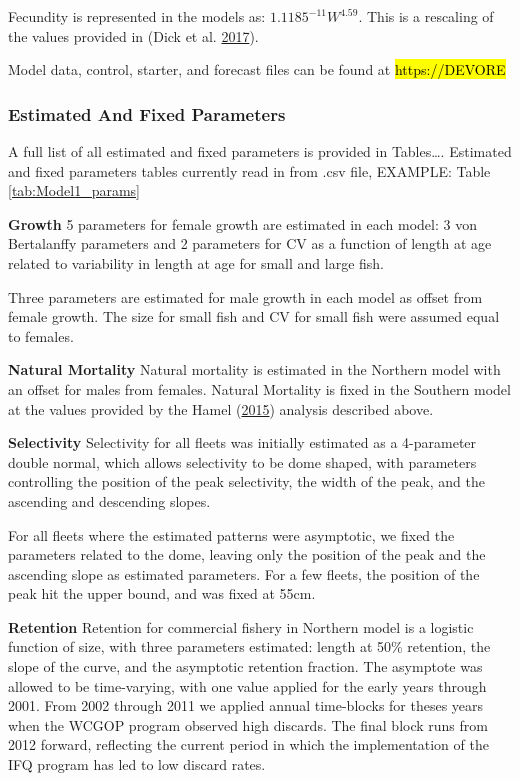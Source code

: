\documentclass[12pt,]{article}
\begin{document}
Fecundity is represented in the models as: \(1.1185^{-11}W^{4.59}\).
This is a rescaling of the values provided in (Dick et al.
\protect\hyperlink{ref-Dick2017}{2017}).

Model data, control, starter, and forecast files can be found at
\hl{https://DEVORE}

\subsubsection{Estimated And Fixed
Parameters}\label{estimated-and-fixed-parameters}

A full list of all estimated and fixed parameters is provided in
Tables\ldots{}. Estimated and fixed parameters tables currently read in
from .csv file, EXAMPLE: Table \ref{tab:Model1_params}

\textbf{Growth} 5 parameters for female growth are estimated in each
model: 3 von Bertalanffy parameters and 2 parameters for CV as a
function of length at age related to variability in length at age for
small and large fish.

Three parameters are estimated for male growth in each model as offset
from female growth. The size for small fish and CV for small fish were
assumed equal to females.

\textbf{Natural Mortality} Natural mortality is estimated in the
Northern model with an offset for males from females. Natural Mortality
is fixed in the Southern model at the values provided by the Hamel
(\protect\hyperlink{ref-Hamel2015}{2015}) analysis described above.

\textbf{Selectivity} Selectivity for all fleets was initially estimated
as a 4-parameter double normal, which allows selectivity to be dome
shaped, with parameters controlling the position of the peak
selectivity, the width of the peak, and the ascending and descending
slopes.

For all fleets where the estimated patterns were asymptotic, we fixed
the parameters related to the dome, leaving only the position of the
peak and the ascending slope as estimated parameters. For a few fleets,
the position of the peak hit the upper bound, and was fixed at 55cm.

\textbf{Retention} Retention for commercial fishery in Northern model is
a logistic function of size, with three parameters estimated: length at
50\% retention, the slope of the curve, and the asymptotic retention
fraction. The asymptote was allowed to be time-varying, with one value
applied for the early years through 2001. From 2002 through 2011 we
applied annual time-blocks for theses years when the WCGOP program
observed high discards. The final block runs from 2012 forward,
reflecting the current period in which the implementation of the IFQ
program has led to low discard rates.
\end{document}
